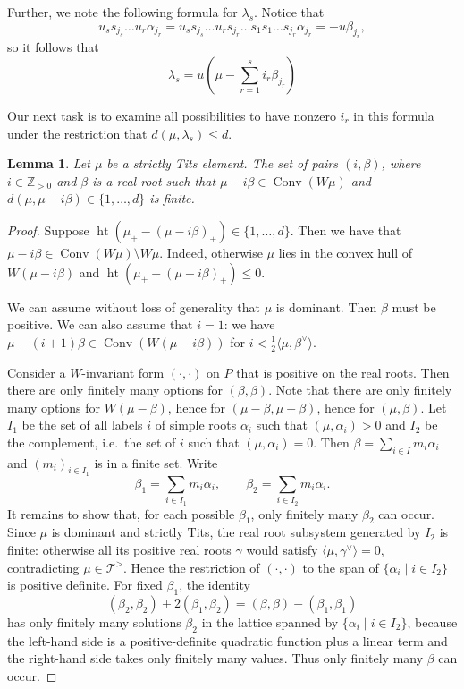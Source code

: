 \documentclass{amsart}
\newcommand{\Z}{\mathbb{Z}}
\newtheorem{Lem}[Thm]{Lemma}
\theoremstyle{definition}
\numberwithin{equation}{section}
\begin{document}
Further, we note the following formula for $\lambda_s$. Notice that $$u_ss_{j_s}\ldots u_r\alpha_{j_r}=u_ss_{j_s}\ldots u_rs_{j_r}\ldots s_1 s_1\ldots s_{j_r}\alpha_{j_r}=-u\beta_{j_r},$$
so it follows that
\begin{equation}\label{eq:lambda_s_formula1}
\lambda_s=u(\mu-\sum_{r=1}^s i_r\beta_{j_r})
\end{equation}

Our next task is to examine all possibilities to have nonzero $i_r$ in this formula under the restriction that $d(\mu,\lambda_s)\leqslant d$.

\begin{Lem}\label{Lem:root_finiteness}
Let $\mu$ be a strictly Tits element.
 The set of pairs $(i,\beta)$, where $i\in \Z_{>0}$ and $\beta$ is a real root such that $\mu-i\beta\in \operatorname{Conv}(W\mu)$ and $d(\mu,\mu-i\beta)\in \{1,\ldots,d\}$ is finite.
\end{Lem}
\begin{proof}
Suppose $\operatorname{ht}(\mu_+-(\mu-i\beta)_+)\in \{1,\ldots,d\}$. Then we have that $\mu-i\beta\in \operatorname{Conv}(W\mu)\setminus W\mu$. Indeed, otherwise $\mu$ lies in the convex hull of $W(\mu-i\beta)$ and $\operatorname{ht}(\mu_+-(\mu-i\beta)_+)\leqslant 0$.

We can assume without loss of generality that $\mu$ is dominant. Then $\beta$ must be positive. We can also assume that $i=1$: we have $\mu-(i+1)\beta\in \operatorname{Conv}(W(\mu-i\beta))$ for $i<\frac{1}{2}\langle\mu,\beta^\vee\rangle$.

Consider a $W$-invariant form $(\cdot,\cdot)$ on $P$ that is positive on the real roots. Then there are only finitely many options for $(\beta,\beta)$. Note that there are only finitely many options for $W(\mu-\beta)$, hence for $(\mu-\beta,\mu-\beta)$, hence for $(\mu,\beta)$. Let $I_1$ be the set of all labels $i$ of simple roots $\alpha_i$ such that $(\mu,\alpha_i)>0$ and $I_2$ be the complement, i.e.\ the set of $i$ such that $(\mu,\alpha_i)=0$. Then $\beta=\sum_{i\in I}m_i \alpha_i$ and $(m_i)_{i\in I_1}$ is in a finite set. Write
\[
\beta_1=\sum_{i\in I_1}m_i\alpha_i,\qquad
\beta_2=\sum_{i\in I_2}m_i\alpha_i.
\]
It remains to show that, for each possible $\beta_1$, only finitely many $\beta_2$ can occur. Since $\mu$ is dominant and strictly Tits, the real root subsystem generated by $I_2$ is finite: otherwise all its positive real roots $\gamma$ would satisfy $\langle\mu,\gamma^\vee\rangle=0$, contradicting $\mu\in \mathcal{T}^>$. Hence the restriction of $(\cdot,\cdot)$ to the span of $\{\alpha_i\mid i\in I_2\}$ is positive definite. For fixed $\beta_1$, the identity
\[
(\beta_2,\beta_2)+2(\beta_1,\beta_2)=(\beta,\beta)-(\beta_1,\beta_1)
\]
has only finitely many solutions $\beta_2$ in the lattice spanned by $\{\alpha_i\mid i\in I_2\}$, because the left-hand side is a positive-definite quadratic function plus a linear term and the right-hand side takes only finitely many values. Thus only finitely many $\beta$ can occur.
\end{proof}
\end{document}
